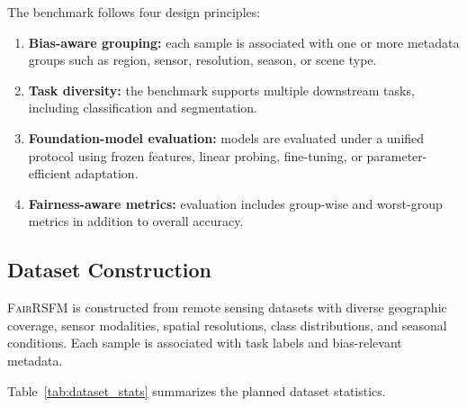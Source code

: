 \documentclass[10pt,twocolumn,letterpaper]{article}
\newcommand{\method}{\textsc{FairRSFM}\xspace}
\begin{document}
The benchmark follows four design principles:
\begin{enumerate}[leftmargin=*]
    \item \textbf{Bias-aware grouping:} each sample is associated with one or more metadata groups such as region, sensor, resolution, season, or scene type.
    \item \textbf{Task diversity:} the benchmark supports multiple downstream tasks, including classification and segmentation. 
    \item \textbf{Foundation-model evaluation:} models are evaluated under a unified protocol using frozen features, linear probing, fine-tuning, or parameter-efficient adaptation.
    \item \textbf{Fairness-aware metrics:} evaluation includes group-wise and worst-group metrics in addition to overall accuracy.
\end{enumerate}

\subsection{Dataset Construction}

\method is constructed from remote sensing datasets with diverse geographic coverage, sensor modalities, spatial resolutions, class distributions, and seasonal conditions. Each sample is associated with task labels and bias-relevant metadata.


Table~\ref{tab:dataset_stats} summarizes the planned dataset statistics.

\begin{table}[t]
\centering
\caption{Planned statistics of the \method benchmark. Replace the TODO entries with final numbers.}
\label{tab:dataset_stats}
\end{table}
\end{document}
